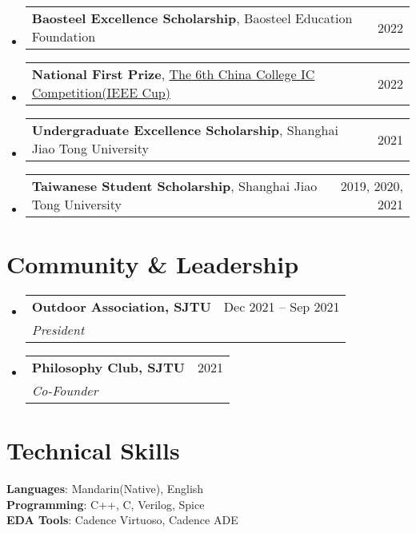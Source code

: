 \documentclass[letterpaper,11pt]{article}
\makeatletter
\newcommand{\resumeItem}[1]{
  \item\small{
    {#1 \vspace{-2pt}}
  }
}
\newcommand{\resumeSubheading}[4]{
  \vspace{-2pt}\item
    \begin{tabular*}{0.97\textwidth}[t]{l@{\extracolsep{\fill}}r}
      \textbf{#1} & #2 \\
      \textit{\small#3} & \textit{\small #4} \\
    \end{tabular*}\vspace{-7pt}
}
\newcommand{\resumeProjectHeading}[2]{
    \item
    \begin{tabular*}{0.97\textwidth}{l@{\extracolsep{\fill}}r}
      \small#1 & #2 \\
    \end{tabular*}\vspace{-7pt}
}
\newcommand{\resumeSubHeadingListStart}{\begin{itemize}[leftmargin=0.15in, label={}]}
\newcommand{\resumeSubHeadingListEnd}{\end{itemize}}
\newcommand{\resumeItemListStart}{\begin{itemize}}
\newcommand{\resumeItemListEnd}{\end{itemize}\vspace{-5pt}}
\makeatother
\begin{document}
    \resumeSubHeadingListStart
      \resumeProjectHeading
          {\textbf{Baosteel Excellence Scholarship}, {Baosteel Education Foundation}}{2022}
      \resumeProjectHeading
          {\textbf{National First Prize}, \href{http://univ.ciciec.com/col.jsp?id=151}{The 6th China College IC Competition(IEEE Cup)}}{2022}
      
      \resumeProjectHeading
          {\textbf{Undergraduate Excellence Scholarship}{, Shanghai Jiao Tong University}}{2021}
      \resumeProjectHeading
          {\textbf{Taiwanese Student Scholarship}{, Shanghai Jiao Tong University}}{2019, 2020, 2021}

    \resumeSubHeadingListEnd
\section{Community \& Leadership}
  \resumeSubHeadingListStart

    \resumeSubheading
      {Outdoor Association, SJTU}{Dec 2021 – Sep 2021}
      {President}{}
      
     \resumeSubheading
      {Philosophy Club, SJTU}{2021}
      {Co-Founder}{}


    \resumeSubHeadingListEnd
\section{Technical Skills}
 \begin{itemize}[leftmargin=0.15in, label={}]
    \small{\item{
     \textbf{Languages}{: Mandarin(Native), English} \\
     \textbf{Programming}{: C++, C, Verilog, Spice} \\
     \textbf{EDA Tools}{: Cadence Virtuoso, Cadence ADE}
    }}
 \end{itemize}


\end{document}
